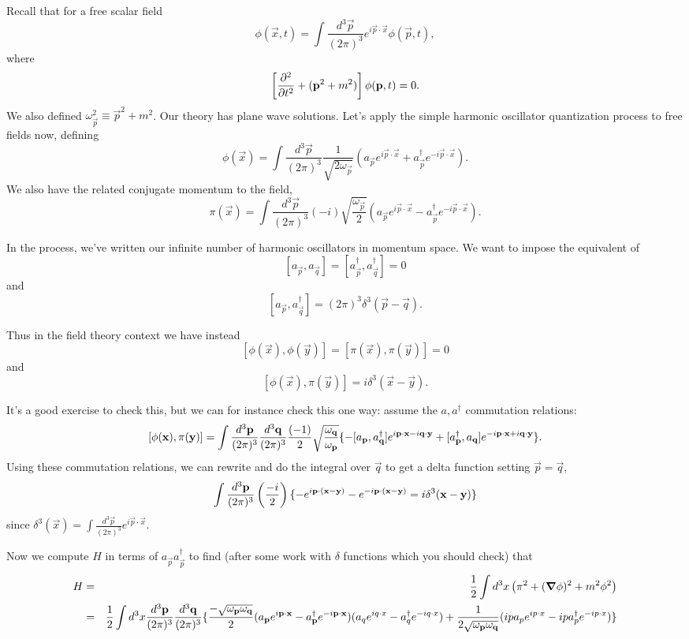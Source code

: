 Recall that for a free scalar field $$\phi(\vec{x},t)=\int \frac{d^3 \vec{p}}{(2\pi)^3} e^{i \vec{p}\cdot \vec{x}}\phi(\vec{p},t),$$ where
$$\left[\P[2]{}{t}+(\vec{p}^2 +m^2)\right]\phi(\vec{p},t)=0.$$
We also defined $\omega_{\vec{p}}^2\equiv \vec{p}^2 +m^2$.
Our theory has plane wave solutions. 
Let's apply the simple harmonic oscillator quantization process to free fields now, defining
$$\phi(\vec{x})=\int \frac{d^3 \vec{p}}{(2\pi)^3}\frac{1}{\sqrt{2\omega_{\vec p}}}(a_{\vec p}e^{i\vec{p} \cdot \vec x}+a^\dagger_{\vec p}e^{-i\vec{p} \cdot \vec x}).$$
We also have the related conjugate momentum to the field,
$$\pi(\vec{x})=\int \frac{d^3 \vec{p}}{(2\pi)^3}(-i)\sqrt{\frac{\omega_{\vec p}}{2}}(a_{\vec p}e^{i\vec{p} \cdot \vec x}-a^\dagger_{\vec p}e^{-i\vec{p} \cdot \vec x}).$$

In the  process, we've written our infinite number of harmonic oscillators in momentum space. We want to impose the equivalent of $$[a_{\vec p},a_{\vec q}]=[a^\dagger_{\vec p}, a^\dagger_{\vec q}]=0$$ and $$[a_{\vec p}, a_{\vec q}^\dagger]=(2\pi)^3 \delta^3(\vec p -\vec q).$$

Thus in the field theory context we have instead
$$[\phi(\vec x), \phi(\vec y)]= [\pi (\vec x), \pi (\vec y)]=0$$
and
$$[\phi(\vec x), \pi (\vec y)]=i\delta^3 (\vec x - \vec y).$$

It's a good exercise to check this, but we can for instance check this one way: assume the $a, a^\dagger$ commutation relations:
$$[\phi(\vec x),\pi(\vec y)]=\int \frac{d^3 \vec p}{(2\pi)^3} \frac{d^3 \vec q}{(2\pi)^3} \frac{(-1)}{2}\sqrt{\frac{\omega_{\vec q}}{\omega_{\vec p}}}\set{ -[a_{\vec p}, a_{\vec q}^\dagger] e^{i\vec p \cdot \vec x - i\vec q \cdot \vec y}+[a_{\vec p}^\dagger, a_{\vec q}] e^{-i\vec p \cdot \vec x + i\vec q \cdot \vec y}}.$$
Using these commutation relations, we can rewrite and do the integral over $\vec q$ to get a delta function setting $\vec p = \vec q$,
$$\int \frac{d^3 \vec p}{(2\pi)^3}\left(\frac{-i}{2}\right)\set{-e^{i\vec p \cdot (\vec x - \vec y)}-e^{-i\vec p \cdot (\vec x - \vec y)}=i \delta^3 (\vec x - \vec y)}$$
since $\delta^3(\vec x)= \int \frac{d^3 \vec p}{(2\pi)^3} e^{i \vec p \cdot \vec x}$.

Now we compute $H$ in terms of $a_{\vec p} a_{\vec p}^\dagger$ to find (after some work with $\delta$ functions which you should check) that
\begin{eqnarray*}
H&=&\frac{1}{2}\int d^3 x \left( \pi^2+(\grad \phi)^2+m^2\phi^2\right)\\
&=& \frac{1}{2}\int d^3x \frac{d^3 \vec p}{(2\pi)^3} \frac{d^3 \vec q}{(2\pi)^3} \set{ \frac{-\sqrt{\omega_{\vec p}\omega_{\vec q}}}{2}(a_{\vec p} e^{i\vec p \cdot \vec x}-a^\dagger_{\vec p} e^{-i \vec p \cdot \vec x})(a_q e^{iq \cdot x}-a_q^\dagger e^{-i q\cdot x})+\frac{1}{2\sqrt{\omega_{\vec p}\omega_{\vec q}}}(ip a_p e^{ip\cdot x}-ip a_p^\dagger e^{-i p\cdot x}) 
}
\end{eqnarray*}

